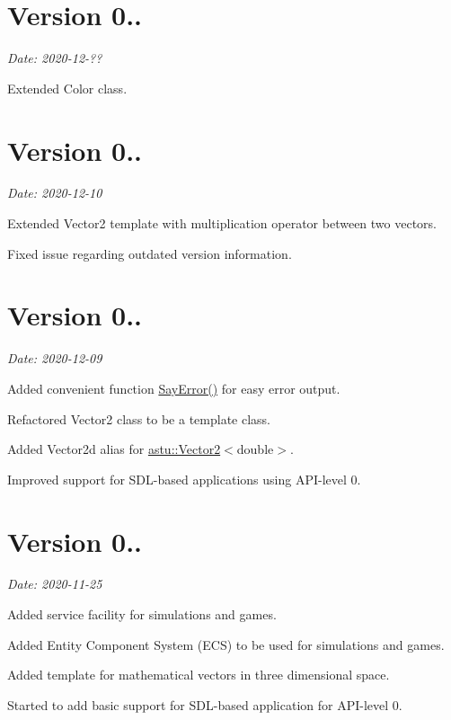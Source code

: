 \section*{Version 0..}

{\itshape Date\+: 2020-\/12-\/??}
\begin{DoxyItemize}
\item Extended {\ttfamily Color} class.
\end{DoxyItemize}

\section*{Version 0..}

{\itshape Date\+: 2020-\/12-\/10}


\begin{DoxyItemize}
\item Extended {\ttfamily Vector2} template with multiplication operator between two vectors.
\item Fixed issue regarding outdated version information.
\end{DoxyItemize}

\section*{Version 0..}

{\itshape Date\+: 2020-\/12-\/09}


\begin{DoxyItemize}
\item Added convenient function {\ttfamily \hyperlink{group__io__group_gaa8fd8044fbf35d58e73087b6399cd82a}{Say\+Error()}} for easy error output.
\item Refactored {\ttfamily Vector2} class to be a template class.
\item Added {\ttfamily Vector2d} alias for {\ttfamily \hyperlink{classastu_1_1Vector2}{astu\+::\+Vector2}$<$double$>$}.
\item Improved support for S\+D\+L-\/based applications using A\+P\+I-\/level 0.
\end{DoxyItemize}

\section*{Version 0..}

{\itshape Date\+: 2020-\/11-\/25}


\begin{DoxyItemize}
\item Added service facility for simulations and games.
\item Added Entity Component System (E\+CS) to be used for simulations and games.
\item Added template for mathematical vectors in three dimensional space.
\item Started to add basic support for S\+D\+L-\/based application for A\+P\+I-\/level 0.
\end{DoxyItemize}

